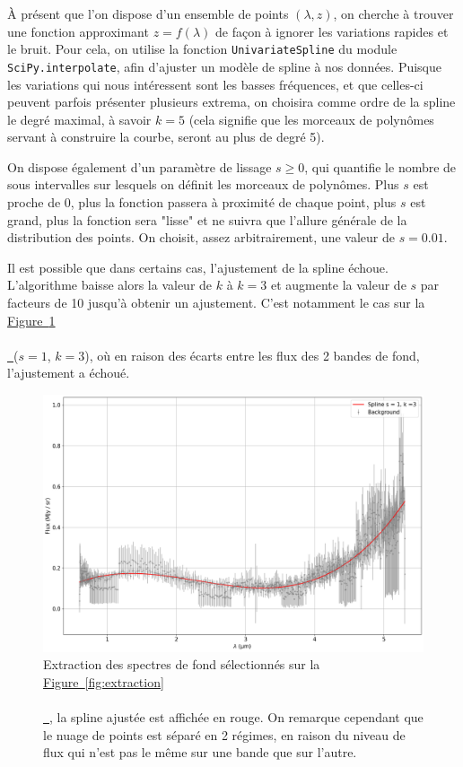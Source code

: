 \documentclass[12pt, a4paper]{article}
\newcommand*{\figref}[2][]{%
  \hyperref[{#2}]{%
    Figure~\ref*{#2}%
    \ifx\\#1\\%
    \else
      \,#1%
    \fi
  }%
}
\begin{document}
À présent que l'on dispose d'un ensemble de points $(\lambda, z)$, on cherche à trouver une fonction approximant $z = f(\lambda)$ de façon à ignorer les variations rapides et le bruit. Pour cela, on utilise la fonction \texttt{UnivariateSpline} du module \texttt{SciPy.interpolate}, afin d'ajuster un modèle de spline à nos données. Puisque les variations qui nous intéressent sont les basses fréquences, et que celles-ci peuvent parfois présenter plusieurs extrema, on choisira comme ordre de la spline le degré maximal, à savoir $k=5$ (cela signifie que les morceaux de polynômes servant à construire la courbe, seront au plus de degré 5). 

On dispose également d'un paramètre de lissage $s \geq 0$, qui quantifie le nombre de sous intervalles sur lesquels on définit les morceaux de polynômes. Plus $s$ est proche de 0, plus la fonction passera à proximité de chaque point, plus $s$ est grand, plus la fonction sera "lisse" et ne suivra que l'allure générale de la distribution des points. On choisit, assez arbitrairement, une valeur de $s=0.01$.

Il est possible que dans certains cas, l'ajustement de la spline échoue. L'algorithme baisse alors la valeur de $k$ à $k=3$ et augmente la valeur de $s$ par facteurs de 10 jusqu'à obtenir un ajustement. C'est notamment le cas sur la \figref{fig:spline_fit} ($s=1$, $k=3$), où en raison des écarts entre les flux des 2 bandes de fond, l'ajustement a échoué.

\begin{figure}[H]
  \centering
  \includegraphics[scale=0.45]{assets/fit_spline.png}
  \caption{Extraction des spectres de fond sélectionnés sur la \figref{fig:extraction}, la spline ajustée est affichée en rouge. On remarque cependant que le nuage de points est séparé en 2 régimes, en raison du niveau de flux qui n'est pas le même sur une bande que sur l'autre.}
  \label{fig:spline_fit}
\end{figure}
\end{document}
